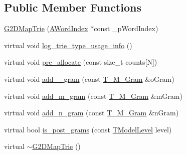 \subsection*{Public Member Functions}
\begin{DoxyCompactItemize}
\item 
\hyperlink{classuva_1_1smt_1_1tries_1_1_g2_d_map_trie_a50e503dddc2a01ade2688c8df32d5640}{G2\+D\+Map\+Trie} (\hyperlink{classuva_1_1smt_1_1tries_1_1dictionary_1_1_a_word_index}{A\+Word\+Index} $\ast$const \+\_\+p\+Word\+Index)
\item 
virtual void \hyperlink{classuva_1_1smt_1_1tries_1_1_g2_d_map_trie_a8a5d0c8c65881a5895692b726f2f8321}{log\+\_\+trie\+\_\+type\+\_\+usage\+\_\+info} ()
\item 
virtual void \hyperlink{classuva_1_1smt_1_1tries_1_1_g2_d_map_trie_a8a1df16ae7be44509ac2d3da07b7bd71}{pre\+\_\+allocate} (const size\+\_\+t counts\mbox{[}N\mbox{]})
\item 
virtual void \hyperlink{classuva_1_1smt_1_1tries_1_1_g2_d_map_trie_a54e165e0783f90a74f3bb9675c012a28}{add\+\_\+\_\+gram} (const \hyperlink{structuva_1_1smt_1_1tries_1_1mgrams_1_1_t___m___gram}{T\+\_\+\+M\+\_\+\+Gram} \&o\+Gram)
\item 
virtual void \hyperlink{classuva_1_1smt_1_1tries_1_1_g2_d_map_trie_a4df6000a2413384cb895d70455fb085a}{add\+\_\+m\+\_\+gram} (const \hyperlink{structuva_1_1smt_1_1tries_1_1mgrams_1_1_t___m___gram}{T\+\_\+\+M\+\_\+\+Gram} \&m\+Gram)
\item 
virtual void \hyperlink{classuva_1_1smt_1_1tries_1_1_g2_d_map_trie_a0b9497cafbcd2d5330b76ea2ae5d8e87}{add\+\_\+n\+\_\+gram} (const \hyperlink{structuva_1_1smt_1_1tries_1_1mgrams_1_1_t___m___gram}{T\+\_\+\+M\+\_\+\+Gram} \&n\+Gram)
\item 
virtual bool \hyperlink{classuva_1_1smt_1_1tries_1_1_g2_d_map_trie_af24619edf2b59c3299a32838512bb6bb}{is\+\_\+post\+\_\+grams} (const \hyperlink{namespaceuva_1_1smt_1_1tries_a20577a44b3a42d26524250634379b7cb}{T\+Model\+Level} level)
\item 
virtual \hyperlink{classuva_1_1smt_1_1tries_1_1_g2_d_map_trie_afae7bbd4d95d2e11c2ecff60866d2756}{$\sim$\+G2\+D\+Map\+Trie} ()
\end{DoxyCompactItemize}
